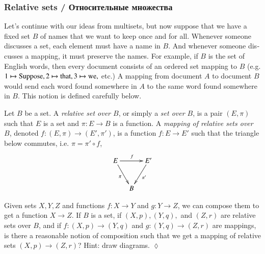 \documentclass[a4paper]{book}
\def\tn{\textnormal}
\def\to{\rightarrow}
\def\taking{\colon}
\theoremstyle{myth}
\newtheorem{excENG}[envENG]{\begin{english}Exercise\end{english}}
\newtheorem{definitionENG}[envENG]{\begin{english}Definition\end{english}}
\newenvironment{exerciseENG}{\begin{excENG}}{\hspace*{\fill}$\lozenge$\end{excENG}}
\newtheorem{definitionRUS}[envRUS]{\begin{russian}Определение\end{russian}}
\begin{document}
\begin{english}
\subsubsection{Relative sets / Относительные множества}\label{sec:relative sets}

Let's continue with our ideas from multisets, but now suppose that we have a fixed set $B$ of names that we want to keep once and for all. Whenever someone discusses a set, each element must have a name in $B$. And whenever someone discusses a mapping, it must preserve the names. For example, if $B$ is the set of English words, then every document consists of an ordered set mapping to $B$ (e.g. $1\mapsto \tn{Suppose}, 2\mapsto\tn{that}, 3\mapsto\tn{we},$ etc.) A mapping from document $A$ to document $B$ would send each word found somewhere in $A$ to the same word found somewhere in $B$. This notion is defined carefully below.

\begin{russian} \end{russian}

\begin{definitionENG}\label{def:relative sets}
Let $B$ be a set. A {\em relative set over $B$}, or simply a {\em set over $B$}, is a pair $(E,\pi)$ such that $E$ is a set and $\pi\taking E\to B$ is a function. A {\em mapping of relative sets over $B$}, denoted $f\taking (E,\pi)\to(E',\pi')$, is a function $f\taking E\to E'$ such that the triangle below commutes, i.e. $\pi=\pi'\circ f$,
$$
\xymatrix@=10pt{E\ar[rr]^f\ar[rdd]_{\pi}&&E'\ar[ldd]^{\pi'}\\\\&B
}
$$
\end{definitionENG}

\begin{definitionRUS}\label{def:relative sets}
\begin{russian} \end{russian}
\end{definitionRUS}

\begin{exerciseENG}
Given sets $X,Y,Z$ and functions $f\taking X\to Y$ and $g\taking Y\to Z$, we can compose them to get a function $X\to Z$. If $B$ is a set, if $(X,p), (Y,q),$ and $(Z,r)$ are relative sets over $B$, and if $f\taking (X,p)\to (Y,q)$ and $g\taking (Y,q)\to (Z,r)$ are mappings, is there a reasonable notion of composition such that we get a mapping of relative sets $(X,p)\to (Z,r)$? Hint: draw diagrams.
\end{exerciseENG}


\end{english}
\end{document}
